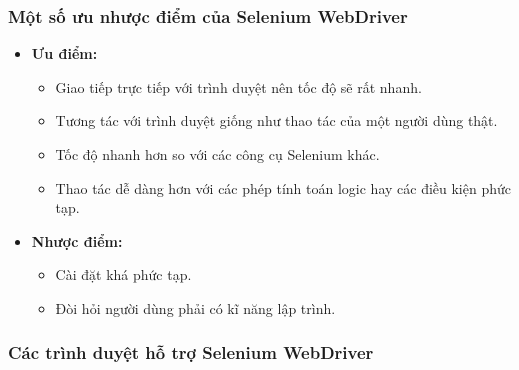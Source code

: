 \subsubsection{Một số ưu nhược điểm của Selenium WebDriver}
\begin{itemize}
	
	\item \textbf{Ưu điểm:}
	
	\begin{itemize}
		\item Giao tiếp trực tiếp với trình duyệt nên tốc độ sẽ rất nhanh.
		\item Tương tác với trình duyệt giống như thao tác của một người dùng thật.
		\item Tốc độ nhanh hơn so với các công cụ Selenium khác.
		\item Thao tác dễ dàng hơn với các phép tính toán logic hay các điều kiện phức tạp.
	\end{itemize}
	
	\item \textbf{Nhược điểm:}
	
	\begin{itemize}
		\item Cài đặt khá phức tạp.
		\item Đòi hỏi người dùng phải có kĩ năng lập trình.\\
	\end{itemize}
\end{itemize}

\subsubsection{Các trình duyệt hỗ trợ Selenium WebDriver}

